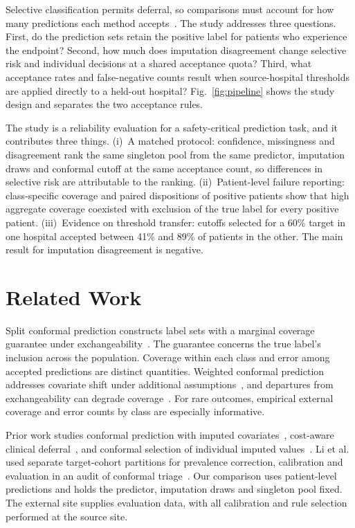 \documentclass[conference]{IEEEtran}
\begin{document}
Selective classification permits deferral, so comparisons must account for how many predictions each method accepts~\cite{geifman2017,traub2024}. The study addresses three questions. First, do the prediction sets retain the positive label for patients who experience the endpoint? Second, how much does imputation disagreement change selective risk and individual decisions at a shared acceptance quota? Third, what acceptance rates and false-negative counts result when source-hospital thresholds are applied directly to a held-out hospital? Fig.~\ref{fig:pipeline} shows the study design and separates the two acceptance rules.

The study is a reliability evaluation for a safety-critical prediction task, and it contributes three things. (i)~A matched protocol: confidence, missingness and disagreement rank the same singleton pool from the same predictor, imputation draws and conformal cutoff at the same acceptance count, so differences in selective risk are attributable to the ranking. (ii)~Patient-level failure reporting: class-specific coverage and paired dispositions of positive patients show that high aggregate coverage coexisted with exclusion of the true label for every positive patient. (iii)~Evidence on threshold transfer: cutoffs selected for a 60\% target in one hospital accepted between 41\% and 89\% of patients in the other. The main result for imputation disagreement is negative.

\section{Related Work}

Split conformal prediction constructs label sets with a marginal coverage guarantee under exchangeability~\cite{vovk2005,angelopoulos2023}. The guarantee concerns the true label's inclusion across the population. Coverage within each class and error among accepted predictions are distinct quantities. Weighted conformal prediction addresses covariate shift under additional assumptions~\cite{tibshirani2019}, and departures from exchangeability can degrade coverage~\cite{barber2023}. For rare outcomes, empirical external coverage and error counts by class are especially informative.

Prior work studies conformal prediction with imputed covariates~\cite{zaffran2023}, cost-aware clinical deferral~\cite{kwon2026}, and conformal selection of individual imputed values~\cite{he2026}. Li et al. used separate target-cohort partitions for prevalence correction, calibration and evaluation in an audit of conformal triage~\cite{li2026}. Our comparison uses patient-level predictions and holds the predictor, imputation draws and singleton pool fixed. The external site supplies evaluation data, with all calibration and rule selection performed at the source site.
\end{document}
